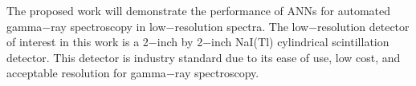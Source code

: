 \documentclass[tocnosub,noragright,centerchapter,12pt,fullpage]{uiucecethesis09}
\begin{document}




The proposed work will demonstrate the performance of ANNs for automated gamma$-$ray spectroscopy in low$-$resolution spectra. The low$-$resolution detector of interest in this work is a 2$-$inch by 2$-$inch NaI(Tl) cylindrical scintillation detector. This detector is industry standard due to its ease of use, low cost, and acceptable resolution for gamma$-$ray spectroscopy. 
\end{document}
